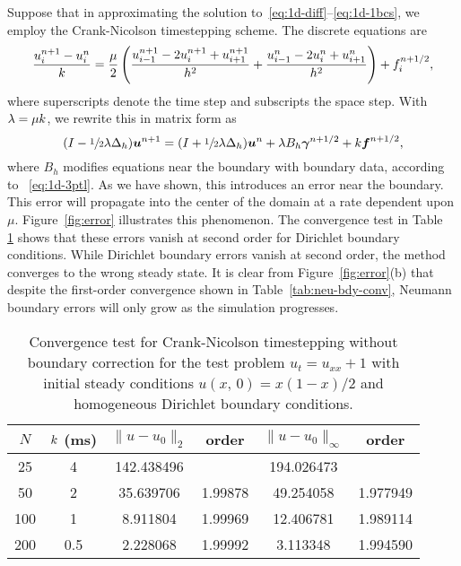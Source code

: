 Suppose that in approximating the solution to~\eqref{eq:1d-diff}--\eqref{eq:1d-1bcs}, we
employ the Crank-Ni\-col\-son timestepping scheme. The discrete equations are
\begin{equation}
    \frac{u_i^{n+1}-u_i^n}{k} = \frac{\mu}2\left(\frac{u_{i-1}^{n+1}-2u_i^{n+1}+u_{i+1}^{n+1}}{h^2} + \frac{u_{i-1}^n-2u_i^n+u_{i+1}^n}{h^2}\right) + f_i^{n+1/2},
    \label{eq:disc-1d-diff}
\end{equation}
where superscripts denote the time step and subscripts the space step. With
$\lambda=\mu k$, we rewrite this in matrix form as
\begin{equation}\label{eq:disc-1d-diff-mat}
    (I-\sfrac12\lambda \Delta_h)\boldsymbol{u}^{n+1} = (I+\sfrac12\lambda \Delta_h)\boldsymbol{u}^n + \lambda B_h\boldsymbol{\gamma}^{n+1/2} + k\boldsymbol{f}^{n+1/2},
\end{equation}
where $B_h$ modifies equations near the boundary with boundary data, according to~%
\eqref{eq:1d-3ptl}. As we have shown, this introduces an error near the boundary.
This error will propagate into the center of the domain at a rate dependent upon $\mu$.
Figure~\ref{fig:error} illustrates this phenomenon. The convergence test in Table~%
\ref{tab:dir-bdy-conv} shows that these errors vanish at second order for Dirichlet
boundary conditions. While Dirichlet boundary errors vanish at second order, the method
converges to the wrong steady state. It is clear from Figure~\ref{fig:error}(b) that
despite the first-order convergence shown in Table~\ref{tab:neu-bdy-conv}, Neumann
boundary errors will only grow as the simulation progresses.

\begin{table}[t]
\centering
\caption[Convergence of Dirichlet boundary errors on a staggered grid]{%
    Convergence test for Crank-Nicolson timestepping without boundary correction for the
    test problem $u_t = u_{xx} + 1$ with initial steady conditions $u(x,\,0) = x(1-x)/2$
    and homogeneous Dirichlet boundary conditions.
}\label{tab:dir-bdy-conv}
\begingroup
\setlength{\tabcolsep}{9pt}
\renewcommand{\arraystretch}{1.5}
\begin{tabular}{cc|cc|cc}
    \toprule
    $N$ & $k$ (ms) & $\|u-u_0\|_2$ &   order & $\|u-u_0\|_{\infty}$ &    order \\ \midrule
     25 & 4                &   142.438496  &         &           194.026473 &          \\
     50 & 2                &    35.639706  & 1.99878 &            49.254058 &  1.977949 \\
    100 & 1                &     8.911804  & 1.99969 &            12.406781 &  1.989114 \\
    200 & 0.5              &     2.228068  & 1.99992 &             3.113348 &  1.994590 \\
    \bottomrule
\end{tabular}
\endgroup
\end{table}

